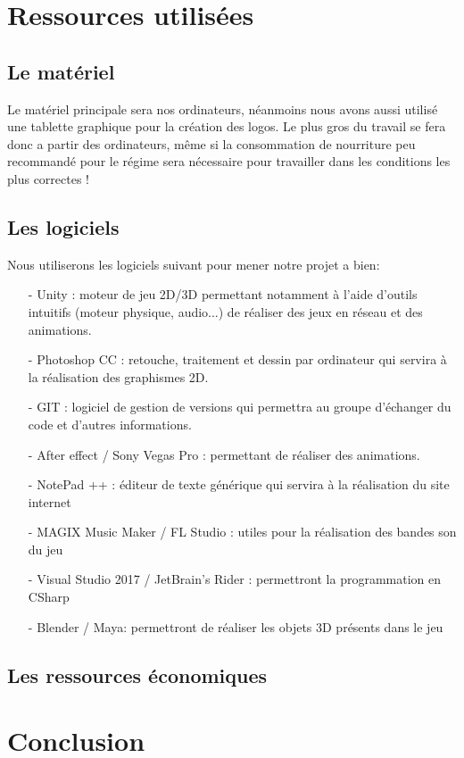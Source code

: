 \documentclass[12pt,a4paper]{article}
\begin{document}
\section{Ressources utilisées}
\subsection{Le matériel}
Le matériel principale sera nos ordinateurs, néanmoins nous avons aussi utilisé une tablette graphique
pour la création des logos.
Le plus gros du travail se fera donc a partir des ordinateurs, même si la consommation de nourriture
peu recommandé pour le régime sera nécessaire pour travailler dans les conditions les plus correctes !
\subsection{Les logiciels}
Nous utiliserons les logiciels suivant pour mener notre projet a bien:
\begin{itemize}
\item[-] Unity : moteur de jeu 2D/3D permettant notamment à l'aide d'outils
intuitifs (moteur physique, audio...) de réaliser des jeux en réseau et
des animations.
\item[-] Photoshop CC : retouche, traitement et dessin par
ordinateur qui servira à la réalisation des graphismes 2D.
\item[-] GIT : logiciel de gestion de versions qui permettra au groupe d'échanger du code et d’autres informations.
\item[-] After effect / Sony Vegas Pro : permettant de réaliser des animations.
\item[-] NotePad ++ : éditeur de texte générique qui servira à la réalisation
du site internet
\item[-] MAGIX Music Maker / FL Studio : utiles pour la
réalisation des bandes son du jeu
\item[-] Visual Studio 2017 / JetBrain's Rider : permettront la programmation en CSharp
\item[-] Blender / Maya: permettront de réaliser les objets 3D présents dans le jeu
\end{itemize}
\subsection{Les ressources économiques}

\newpage
\section{Conclusion}	
\end{document}

